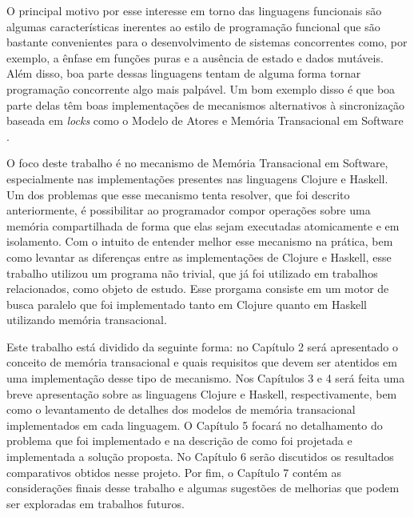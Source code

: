 O principal motivo por esse interesse em torno das linguagens funcionais são algumas características inerentes ao estilo de programação funcional que são bastante convenientes para o desenvolvimento de sistemas concorrentes como, por exemplo, a ênfase em funções puras e a ausência de estado e dados mutáveis. Além disso, boa parte dessas linguagens tentam de alguma forma tornar programação concorrente algo mais palpável. Um bom exemplo disso é que boa parte delas têm boas implementações de mecanismos alternativos à sincronização baseada em \emph{locks} como o Modelo de Atores \cite{agha1986actors} e Memória Transacional em Software \cite{shavit1995software}.

O foco deste trabalho é no mecanismo de Memória Transacional em Software, especialmente nas implementações presentes nas linguagens Clojure e Haskell. Um dos problemas que esse mecanismo  tenta resolver, que foi descrito anteriormente, é possibilitar ao programador compor operações sobre uma memória compartilhada de forma que elas sejam executadas atomicamente e em isolamento. Com o intuito de entender melhor esse mecanismo na prática, bem como levantar as diferenças entre as implementações de Clojure e Haskell, esse trabalho utilizou um programa não trivial, que já foi utilizado em trabalhos relacionados, como objeto de estudo. Esse prorgama consiste em um motor de busca paralelo que foi implementado tanto em Clojure quanto em Haskell utilizando memória transacional. 

Este trabalho está dividido da seguinte forma: no Capítulo 2 será apresentado o conceito de memória transacional e quais requisitos que devem ser atentidos em uma implementação desse tipo de mecanismo. Nos Capítulos 3 e 4 será feita uma breve apresentação sobre as linguagens Clojure e Haskell, respectivamente, bem como o levantamento de detalhes dos modelos de memória transacional implementados em cada linguagem. O Capítulo 5 focará no detalhamento do problema que foi implementado e na descrição de como foi projetada e implementada a solução proposta. No Capítulo 6 serão discutidos os resultados comparativos obtidos nesse projeto. Por fim, o Capítulo 7 contém as considerações finais desse trabalho e algumas sugestões de melhorias que podem ser exploradas em trabalhos futuros.